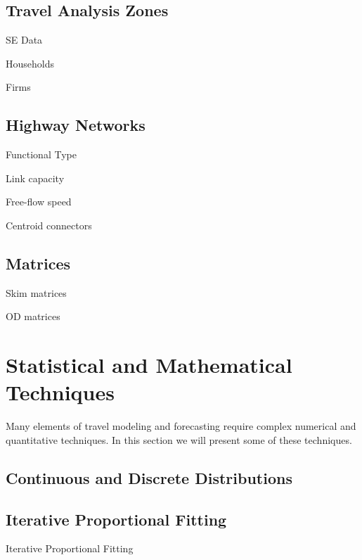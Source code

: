 \documentclass[]{book}
\begin{document}
\hypertarget{travel-analysis-zones}{%
\subsection{Travel Analysis Zones}\label{travel-analysis-zones}}

SE Data

Households

Firms

\hypertarget{highway-networks}{%
\subsection{Highway Networks}\label{highway-networks}}

Functional Type

Link capacity

Free-flow speed

Centroid connectors

\hypertarget{matrices}{%
\subsection{Matrices}\label{matrices}}

Skim matrices

OD matrices

\hypertarget{statistical-and-mathematical-techniques}{%
\section{Statistical and Mathematical Techniques}\label{statistical-and-mathematical-techniques}}

Many elements of travel modeling and forecasting require complex numerical and
quantitative techniques. In this section we will present some of these techniques.

\hypertarget{continuous-and-discrete-distributions}{%
\subsection{Continuous and Discrete Distributions}\label{continuous-and-discrete-distributions}}

\hypertarget{iterative-proportional-fitting}{%
\subsection{Iterative Proportional Fitting}\label{iterative-proportional-fitting}}

Iterative Proportional Fitting
\end{document}

